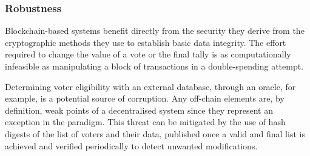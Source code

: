 \documentclass[../main.tex]{subfiles}
\begin{document}
\subsubsection{Robustness}
\label{robustness}
Blockchain-based systems benefit directly from the security they derive from the cryptographic methods they use to establish basic data integrity. The effort required to change the value of a vote or the final tally is as computationally infeasible as manipulating a block of transactions in a double-spending attempt.
\par
Determining voter eligibility with an external database, through an oracle, for example, is a potential source of corruption. Any off-chain elements are, by definition, weak points of a decentralised system since they represent an exception in the paradigm. This threat can be mitigated by the use of hash digests of the list of voters and their data, published once a valid and final list is achieved and verified periodically to detect unwanted modifications.
\end{document}
